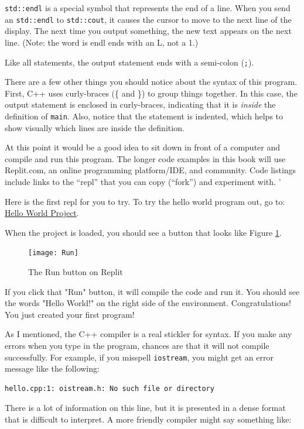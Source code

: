
{\tt std::endl} is a special symbol that represents the end of a
line.  When you send an {\tt std::endl} to {\tt std::cout}, it causes the
cursor to move to the next line of the display.
The next time you output something, the new text appears
on the next line. (Note: the word is endl ends with an L, not a 1.)

Like all statements, the output statement ends with a
semi-colon ({\tt ;}).

There are a few other things you should notice about the syntax of
this program.  First, C++ uses curly-braces (\{ and
\}) to group things together.  In this case, the output statement
is enclosed in curly-braces, indicating that it is {\em inside} the
definition of {\tt main}.  Also, notice that the statement is
indented, which helps to show visually which lines are inside the
definition.

At this point it would be a good idea to sit down in front of
a computer and compile and run this program.  
The longer code examples in this book will use Replit.com, an online programming
platform/IDE, and community. Code listings include links to the “repl” that you can copy 
(“fork”) and experiment with.
'

Here is the first repl for you to try. To try the hello world program out, go to:
\href{https://replit.com/@lpatacch/helloWorld#hello.cpp}{Hello World Project}.

When the project is loaded, you should see a button that looks like Figure \ref{fig:Run}.
\smallskip
\begin{figure}
    \centering
    \texttt{[image: Run]}
    \caption{The Run button on Replit}
    \label{fig:Run}
\end{figure}

If you click that "Run" button, it will compile the code and run it. You should see the words "Hello World!" on the right side of the environment. Congratulations! You just created your first program!

As I mentioned, the C++ compiler is a real stickler for syntax.
If you make any errors when you type in the program, chances
are that it will not compile successfully.  For example, if
you misspell {\tt iostream}, you might get an error message like
the following:

\begin{verbatim}
hello.cpp:1: oistream.h: No such file or directory
\end{verbatim}
%
There is a lot of information on this line, but it is presented
in a dense format that is difficult to interpret.  A more friendly
compiler might say something like:

